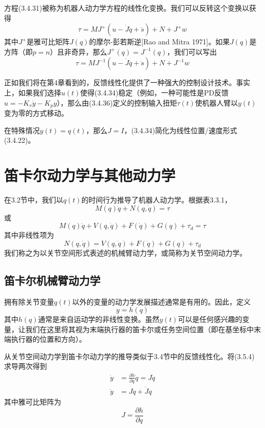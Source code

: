 \documentclass[12pt,a4paper]{ctexart}
\begin{document}
方程(3.4.31)被称为机器人动力学方程的线性化变换。我们可以反转这个变换以获得
\begin{equation}
\tau = M J^+ (u - \dot{J}\dot{q} + \ddot{s}) + N + J^+ w
\end{equation}
其中$J^+$是雅可比矩阵$J(q)$的摩尔-彭若斯逆[Rao and Mitra 1971]。如果$J(q)$是方阵（即$p = n$）且非奇异，那么$J^+(q) = J^{-1}(q)$，我们可以写出
\begin{equation}
\tau = M J^{-1} (u - \dot{J}\dot{q} + \ddot{s}) + N + J^{-1} w
\end{equation}

正如我们将在第4章看到的，反馈线性化提供了一种强大的控制设计技术。事实上，如果我们选择$u(t)$使得(3.4.34)稳定（例如，一种可能性是PD反馈$u = -K_v \dot{y} - K_p y$），那么由(3.4.36)定义的控制输入扭矩$\tau(t)$使机器人臂以$y(t)$变为零的方式移动。

在特殊情况$y(t) = q(t)$，那么$J = I$，(3.4.34)简化为线性位置/速度形式(3.4.22)。

\section{笛卡尔动力学与其他动力学}

在3.2节中，我们以$q(t)$的时间行为推导了机器人动力学。根据表3.3.1，
\begin{equation}
M(q)\ddot{q} + N(q,\dot{q}) = \tau
\end{equation}
或
\begin{equation}
M(q)\ddot{q} + V(q,\dot{q}) + F(\dot{q}) + G(q) + \tau_d = \tau
\end{equation}
其中非线性项为
\begin{equation}
N(q,\dot{q}) = V(q,\dot{q}) + F(\dot{q}) + G(q) + \tau_d
\end{equation}
我们称之为以关节空间形式表述的机械臂动力学，或简称为关节空间动力学。

\subsection{笛卡尔机械臂动力学}

拥有除关节变量$q(t)$以外的变量的动力学发展描述通常是有用的。因此，定义
\begin{equation}
y = h(q)
\end{equation}
其中$h(q)$通常是来自运动学的非线性变换。虽然$y(t)$可以是任何感兴趣的变量，让我们在这里将其视为末端执行器的笛卡尔或任务空间位置（即在基坐标中末端执行器的位置和方向）。

从关节空间动力学到笛卡尔动力学的推导类似于3.4节中的反馈线性化。将(3.5.4)求导两次得到
\begin{align}
\dot{y} &= \frac{\partial h}{\partial q}\dot{q} = J\dot{q} \\
\ddot{y} &= J\ddot{q} + \dot{J}\dot{q}
\end{align}
其中雅可比矩阵为
\begin{equation}
J = \frac{\partial h}{\partial q}
\end{equation}
\end{document}
